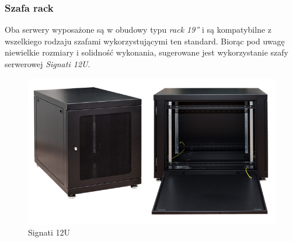 \subsubsection{Szafa rack}

Oba serwery wyposażone są w obudowy typu \textit{rack 19''} i są kompatybilne z wszelkiego rodzaju szafami wykorzystującymi ten standard. Biorąc pod uwagę niewielkie rozmiary i solidność wykonania, sugerowane jest wykorzystanie szafy serwerowej \textit{Signati 12U}.

\begin{figure}[H]
  \includegraphics[width=\textwidth]{images/szafa_12U.jpg}
  \caption{Signati 12U}
\end{figure}